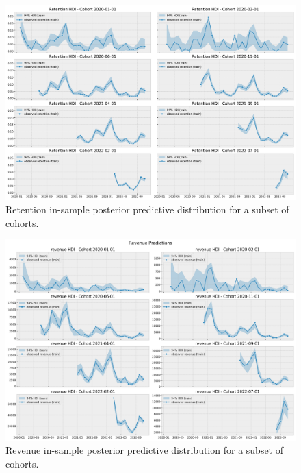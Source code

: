 \documentclass[11pt]{amsart}
\theoremstyle{definition}
\begin{document}
\begin{figure}
    \centering
    \includegraphics[width=\textwidth]{images/revenue_retention_51_0.png}
    \caption{Retention in-sample posterior predictive distribution for a subset of
    cohorts.}
    \label{fig:in_sample_retention}
\end{figure}

\begin{figure}
    \centering
    \includegraphics[width=\textwidth]{images/revenue_retention_53_0.png}
    \caption{Revenue in-sample posterior predictive distribution for a subset of
    cohorts.}
    \label{fig:in_sample_revenue}
\end{figure}
\end{document}
